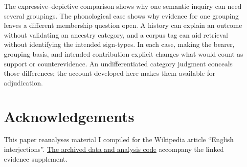 \documentclass[12pt]{article}
\newif\ifblind
\begin{document}
The expressive--depictive comparison shows why one semantic inquiry can
need several groupings. The phonological case shows why evidence for
one grouping leaves a different membership question open. A history
can explain an outcome without validating an ancestry category, and a
corpus tag can aid retrieval without identifying the intended sign-types.
In each case, making the bearer, grouping basis, and intended contribution
explicit changes what would count as support or counterevidence.
An undifferentiated category judgment conceals those differences; the
account developed here makes them available for adjudication.

\ifblind\else
\section*{Acknowledgements}

This paper reanalyses material I compiled for the Wikipedia article
\enquote{English interjections}.
\href{https://github.com/BrettRey/interjections-hpc/tree/master}{The archived
data and analysis code} accompany the linked evidence supplement.
\fi

\clearpage
\begingroup
\setlength{\emergencystretch}{3em}
\printbibliography
\endgroup
\end{document}
